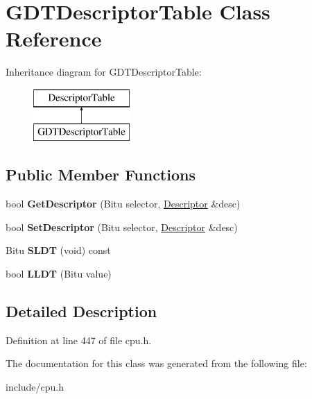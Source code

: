 \hypertarget{classGDTDescriptorTable}{\section{G\-D\-T\-Descriptor\-Table Class Reference}
\label{classGDTDescriptorTable}
}
Inheritance diagram for G\-D\-T\-Descriptor\-Table\-:\begin{figure}[H]
\begin{center}
\leavevmode
\includegraphics[height=2.000000cm]{classGDTDescriptorTable}
\end{center}
\end{figure}
\subsection*{Public Member Functions}
\begin{DoxyCompactItemize}
\item 
\hypertarget{classGDTDescriptorTable_ac76fa58e1a03cd52a1a8e180ac42c52a}{bool {\bfseries Get\-Descriptor} (Bitu selector, \hyperlink{classDescriptor}{Descriptor} \&desc)}\label{classGDTDescriptorTable_ac76fa58e1a03cd52a1a8e180ac42c52a}

\item 
\hypertarget{classGDTDescriptorTable_a6f67ad7a7d505aec8a23dc42bc078cbc}{bool {\bfseries Set\-Descriptor} (Bitu selector, \hyperlink{classDescriptor}{Descriptor} \&desc)}\label{classGDTDescriptorTable_a6f67ad7a7d505aec8a23dc42bc078cbc}

\item 
\hypertarget{classGDTDescriptorTable_ad4541f8edd71d3669157d54a75a4e01b}{Bitu {\bfseries S\-L\-D\-T} (void) const }\label{classGDTDescriptorTable_ad4541f8edd71d3669157d54a75a4e01b}

\item 
\hypertarget{classGDTDescriptorTable_aa6ef4a40eaec4d675ce8e4d06f26f0db}{bool {\bfseries L\-L\-D\-T} (Bitu value)}\label{classGDTDescriptorTable_aa6ef4a40eaec4d675ce8e4d06f26f0db}

\end{DoxyCompactItemize}


\subsection{Detailed Description}


Definition at line 447 of file cpu.\-h.



The documentation for this class was generated from the following file\-:\begin{DoxyCompactItemize}
\item 
include/cpu.\-h\end{DoxyCompactItemize}
